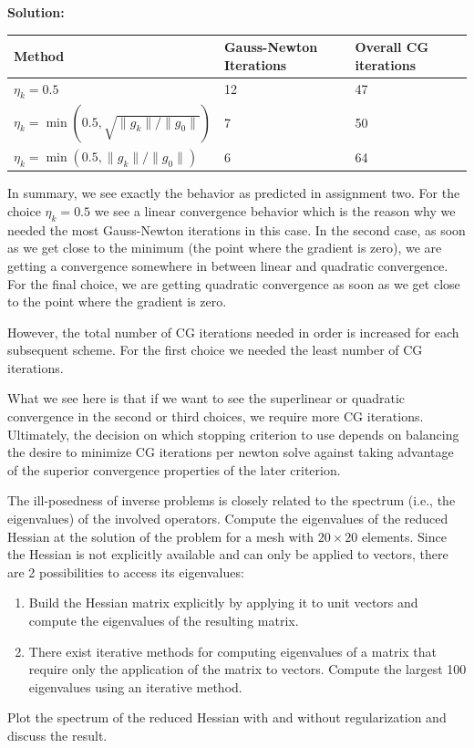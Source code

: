 \documentclass[11pt]{article}
\newenvironment{solution}{\begin{trivlist}\item[]{\bf Solution:}}
                      {\end{trivlist}}
\begin{document}
\begin{enumerate}
\begin{solution}
\begin{center}
 \begin{tabular}{l||l|l}
  Method & Gauss-Newton Iterations & Overall CG iterations\\
  \hline\hline
  $\eta_k=0.5$ & 12 & 47\\
  $\eta_k=\min(0.5,\sqrt{\|g_k\|/\|g_0\|})$ & 7 & 50\\
  $\eta_k=\min(0.5,\|g_k\|/\|g_0\|)$ & 6 & 64
 \end{tabular}
\end{center}

In summary, we see exactly the behavior as predicted in assignment
 two. For the choice $\eta_k=0.5$ we see a linear convergence behavior
 which is the  reason why we needed the most Gauss-Newton iterations in
 this case. In  the second case, as soon as we get close to the minimum
 (the point  where the gradient is zero), we are getting a convergence somewhere
 in between  linear and quadratic convergence. 
 For the final choice, we are getting quadratic convergence as soon as we get close to
 the point where the gradient is zero. 

 However, the total number of CG iterations needed in
 order is increased for each subsequent scheme. 
 For the first choice we needed the least number of CG iterations. 

 What we see here is that if we want to see the superlinear or quadratic
 convergence in the second or third choices, we require more CG
 iterations. Ultimately, the decision on which stopping criterion to use depends on
 balancing the desire to minimize CG iterations per newton solve against
 taking advantage of the superior convergence properties of the later
 criterion. 

\end{solution}

\item[(d)]The ill-posedness of inverse problems is closely related to
	  the spectrum (i.e., the eigenvalues) of the involved
	  operators. Compute the eigenvalues of the reduced Hessian at
	  the solution of the problem for a mesh with $20 \times 20$
	  elements. Since the Hessian is not explicitly available and
	  can only be applied to vectors, there are 2 possibilities to
	  access its eigenvalues: 
\begin{enumerate}
\item[$\bullet$] Build the Hessian matrix explicitly by applying it to
	     unit vectors and compute the eigenvalues of the resulting
	     matrix. 
\item[$\bullet$] There exist iterative methods for computing
	     eigenvalues of a matrix that require only the application
	     of the matrix to vectors. Compute the largest
	     100 eigenvalues using an iterative method. 
\end{enumerate}
Plot the spectrum of the reduced Hessian with and without regularization 
	  and discuss the result. 


\end{enumerate}
\end{document}
